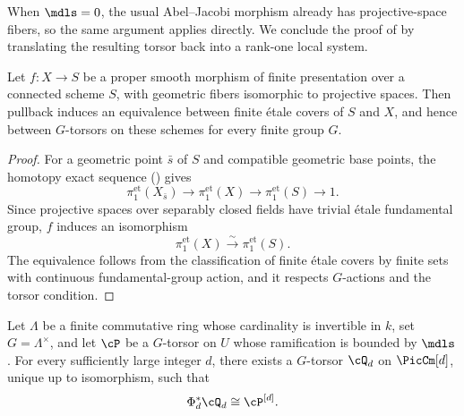 When $\mdls=0$, the usual Abel--Jacobi morphism already has
projective-space fibers, so the same argument applies directly. We conclude
the proof of  by translating the
resulting torsor back into a rank-one local system.

\begin{lemma}
\label{lemma:projective-space-fiber-descent}
Let $f\colon X\to S$ be a proper smooth morphism of finite presentation
over a connected scheme $S$, with geometric fibers isomorphic to projective
spaces. Then pullback induces an equivalence between finite \'etale covers
of $S$ and $X$, and hence between $G$-torsors on these schemes for every
finite group $G$.
\end{lemma}
\begin{proof}
For a geometric point $\bar s$ of $S$ and compatible geometric base points,
the homotopy exact sequence () gives
\[
\pi_1^{\mathrm{et}}(X_{\bar s})\longrightarrow
\pi_1^{\mathrm{et}}(X)\longrightarrow
\pi_1^{\mathrm{et}}(S)\longrightarrow 1.
\]
Since projective spaces over separably closed fields have trivial \'etale
fundamental group, $f$ induces an isomorphism
\[
\pi_1^{\mathrm{et}}(X)\xrightarrow{\sim}\pi_1^{\mathrm{et}}(S).
\]
The equivalence follows from the classification of finite \'etale covers by
finite sets with continuous fundamental-group action, and it respects
$G$-actions and the torsor condition.
\end{proof}

\begin{theorem}\label{thm:GCFT_torsors}
Let $\Lambda$ be a finite commutative ring whose cardinality is invertible
in $k$, set $G=\Lambda^\times$, and let $\cP$ be a $G$-torsor on $U$ whose
ramification is bounded by $\mdls$. For every sufficiently large integer
$d$, there exists a $G$-torsor $\cQ_d$ on $\PicCm[d]$, unique up to
isomorphism, such that
\[
\Phi_d^*\cQ_d\cong\cP^{[d]}.
\]
\end{theorem}

